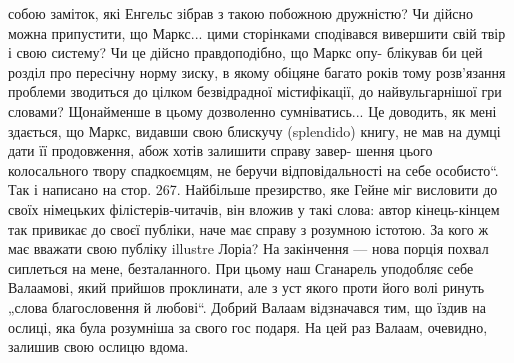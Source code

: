 собою заміток, які Енгельс зібрав з такою побожною дружністю? Чи дійсно можна припустити, що Маркс... цими сторінками
сподівався вивершити свій твір і свою систему? Чи це дійсно правдоподібно, що Маркс опу- блікував би цей розділ про
пересічну норму зиску, в якому обіцяне багато років тому розв’язання проблеми зводиться до цілком безвідрадної містифікації, до найвульгарнішої гри словами? Щонайменше в цьому дозволенно сумніватись... Це доводить, як мені здається, що Маркс,
видавши свою блискучу (splendido) книгу, не мав на думці дати її продовження, абож хотів залишити справу завер- шення цього
колосального твору спадкоємцям, не беручи відповідальності на себе особисто“.
Так і написано на стор. 267. Найбільше презирство, яке Гейне міг висловити до своїх німецьких філістерів-читачів, він вложив
у такі слова: автор кінець-кінцем так привикає до своєї публіки, наче має справу з розумною істотою. За кого ж має вважати
свою публіку illustre Лоріа?
На закінчення — нова порція похвал сиплеться на мене, безталанного. При цьому наш Сганарель уподобляє себе Валаамові, який
прийшов проклинати, але з уст якого проти його волі ринуть „слова благословення й любові“. Добрий Валаам відзначався тим, що
їздив на ослиці, яка була розумніша за свого гос подаря. На цей раз Валаам, очевидно, залишив свою ослицю вдома.
\parbreak{}  %
